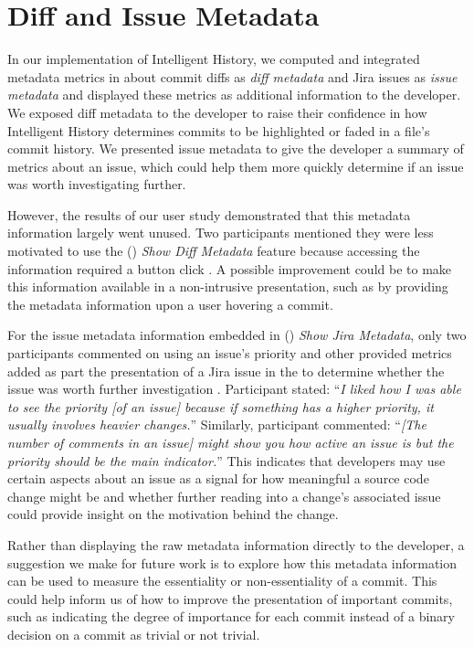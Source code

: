 
\section{Diff and Issue Metadata}

In our implementation of Intelligent History,
we computed and integrated metadata metrics in about commit diffs as \emph{diff metadata} and Jira issues as \emph{issue metadata} 
and displayed these metrics as additional information to the developer.
We exposed diff metadata to the developer to raise their confidence in how Intelligent History
determines commits to be highlighted or faded in a file's commit history.
We presented issue metadata to give the developer a summary of metrics about
an issue, which could help them more quickly determine if an issue was worth investigating further.

However, the results of our user study demonstrated that this metadata information largely went unused.
Two participants mentioned they were less motivated to use the () \textit{Show Diff Metadata} feature
because accessing the information required a button click .
A possible improvement could be to make this information available in a non-intrusive presentation,
such as by providing the metadata information upon a user hovering a commit.

For the issue metadata information embedded in () \textit{Show Jira Metadata},
only two participants commented on using an issue's priority and other provided metrics added as part the presentation
of a Jira issue in the  to determine whether the issue was worth further investigation .
Participant  stated: 
``\textit{I liked how I was able to see the priority [of an issue] because if something has a higher priority, it usually involves heavier changes.}''
Similarly, participant  commented:
``\textit{[The number of comments in an issue] might show you how active an issue is but the priority should be the main indicator.}''
This indicates that developers may use certain aspects about an issue as a signal 
for how meaningful a source code change might be and whether further reading into a change's associated issue
could provide insight on the motivation behind the change.

Rather than displaying the raw metadata information directly to the developer,
a suggestion we make for future work is to explore how this metadata information
can be used to measure the essentiality or non-essentiality of a commit.
This could help inform us of how to improve the presentation of important
commits, such as indicating the degree of importance for each commit 
instead of a binary decision on a commit as trivial or not trivial.

\endinput

Any text after an \endinput is ignored.
You could put scraps here or things in progress.